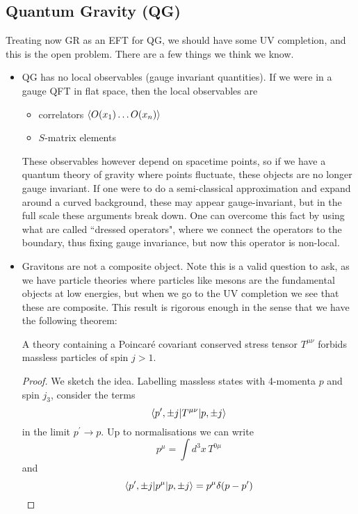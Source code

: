 \documentclass{article}
\begin{document}
\subsection{Quantum Gravity (QG)}
Treating now GR as an EFT for QG, we should have some UV completion, and this is the open problem. There are a few things we think we know.
\begin{itemize}
	\item QG has no local observables (gauge invariant quantities). If we were in a gauge QFT in flat space, then the local observables are 
	\begin{itemize}
		\item correlators $\left\langle O(x_1) \dots O(x_n) \right\rangle$
		\item $S$-matrix elements
	\end{itemize}
   These observables however depend on spacetime points, so if we have a quantum theory of gravity where points fluctuate, these objects are no longer gauge invariant. If one were to do a semi-classical approximation and expand around a curved background, these may appear gauge-invariant, but in the full scale these arguments break down. One can overcome this fact by using what are called ``dressed operators", where we connect the operators to the boundary, thus fixing gauge invariance, but now this operator is non-local. 
   \item Gravitons are not a composite object. Note this is a valid question to ask, as we have particle theories where particles like mesons are the fundamental objects at low energies, but when we go to the UV completion we see that these are composite. This result is rigorous enough in the sense that we have the following theorem:
   \begin{theorem}
   	A theory containing a Poincar\'e covariant conserved stress tensor $T^{\mu\nu}$ forbids massless particles of spin $j>1$. 
   \end{theorem}
   \begin{proof}
   We sketch the idea. Labelling massless states with 4-momenta $p$ and spin $j_3$, consider the terms 
   \[
   \left\langle p^\prime, \pm j  | T^{\mu\nu} | p, \pm j \right\rangle
   \]
   in the limit $p^\prime \to p$. Up to normalisations we can write 
   \[
   p^\mu = \int d^3x \, T^{0\mu}
   \]
   and 
   \[
   \left\langle p^\prime, \pm j  | p^\mu | p, \pm j \right\rangle = p^\mu \delta(p-p^\prime)
   \]
   

\end{proof}
\end{itemize}
\end{document}
